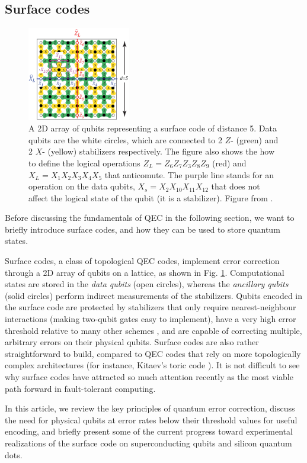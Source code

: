 \subsection{Surface codes}
\begin{figure}
  \centering
  \includegraphics[width=0.4\textwidth]{images/surface_code.png}
  \caption{A 2D array of qubits representing a surface code of distance 5. Data
    qubits are the white circles, which are connected to 2 $Z$- (green) and 2
    $X$- (yellow) stabilizers respectively. The figure also shows the how to
    define the logical operations $Z_L = Z_6Z_7Z_3Z_8Z_9$ (red) and $X_L =
    X_1X_2X_3X_4X_5$ that anticomute. The purple line stands for an operation on
    the data qubits, $X_s = X_2 X_{10}X_{11} X_{12} $ that does not affect the
    logical state of the qubit (it is a stabilizer). Figure from
    \cite{fowler12_surfac_codes}.}
  \label{fig:surface_code}
\end{figure}
Before discussing the fundamentals of QEC in the following section, we want to
briefly introduce surface codes, and how they can be used to store quantum
states.

Surface codes, a class of topological QEC codes, implement error correction
through a 2D array of qubits on a lattice, as shown in Fig.
\ref{fig:surface_code}. Computational states are stored in the \textit{data
  qubits} (open circles), whereas the \textit{ancillary qubits} (solid circles)
perform indirect measurements of the stabilizers. Qubits encoded in the surface
code are protected by stabilizers that only require nearest-neighbour
interactions (making two-qubit gates easy to implement), have a very high error
threshold relative to many other schemes \cite{terhal15}, and are capable of
correcting multiple, arbitrary errors on their physical qubits. Surface codes
are also rather straightforward to build, compared to QEC codes that rely on
more topologically complex architectures (for instance, Kitaev's toric code
\cite{Kitaev_2003}). It is not difficult to see why surface codes have attracted
so much attention recently as the most viable path forward in fault-tolerant
computing.

In this article, we review the key principles of quantum error correction,
discuss the need for physical qubits at error rates below their threshold values
for useful encoding, and briefly present some of the current progress toward
experimental realizations of the surface code on superconducting qubits and
silicon quantum dots.

